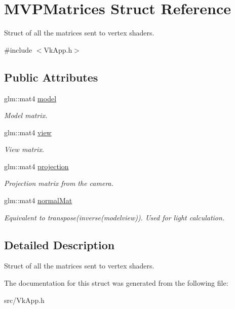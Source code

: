 \hypertarget{struct_m_v_p_matrices}{}\section{M\+V\+P\+Matrices Struct Reference}
\label{struct_m_v_p_matrices}


Struct of all the matrices sent to vertex shaders.  




{\ttfamily \#include $<$Vk\+App.\+h$>$}

\subsection*{Public Attributes}
\begin{DoxyCompactItemize}
\item 
\mbox{\label{struct_m_v_p_matrices_afa1ce24e364a29be35d441674b8178cb}} 
glm\+::mat4 \mbox{\hyperlink{struct_m_v_p_matrices_afa1ce24e364a29be35d441674b8178cb}{model}}
\begin{DoxyCompactList}\small\item\em Model matrix. \end{DoxyCompactList}\item 
\mbox{\label{struct_m_v_p_matrices_a8a1f3dae682ae2191228e2ce610e94a2}} 
glm\+::mat4 \mbox{\hyperlink{struct_m_v_p_matrices_a8a1f3dae682ae2191228e2ce610e94a2}{view}}
\begin{DoxyCompactList}\small\item\em View matrix. \end{DoxyCompactList}\item 
\mbox{\label{struct_m_v_p_matrices_a6f0ceac04d176002de5f4b6e9b7f7c51}} 
glm\+::mat4 \mbox{\hyperlink{struct_m_v_p_matrices_a6f0ceac04d176002de5f4b6e9b7f7c51}{projection}}
\begin{DoxyCompactList}\small\item\em Projection matrix from the camera. \end{DoxyCompactList}\item 
\mbox{\label{struct_m_v_p_matrices_a09bb51da7e83b43b045b0b79fe5f2149}} 
glm\+::mat4 \mbox{\hyperlink{struct_m_v_p_matrices_a09bb51da7e83b43b045b0b79fe5f2149}{normal\+Mat}}
\begin{DoxyCompactList}\small\item\em Equivalent to transpose(inverse(modelview)). Used for light calculation. \end{DoxyCompactList}\end{DoxyCompactItemize}


\subsection{Detailed Description}
Struct of all the matrices sent to vertex shaders. 

The documentation for this struct was generated from the following file\+:\begin{DoxyCompactItemize}
\item 
src/Vk\+App.\+h\end{DoxyCompactItemize}
